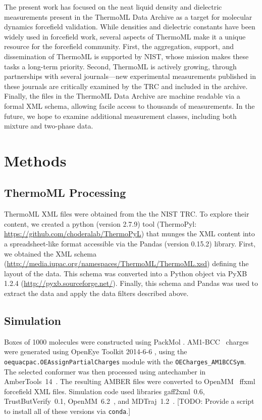 \documentclass[aps,pre,twocolumn,nofootinbib,superscriptaddress,linenumbers]{revtex4-1}
\begin{document}
The present work has focused on the neat liquid density and dielectric measurements present in the ThermoML Data Archive \cite{frenkel2006xml, frenkel2003thermoml, chirico2003thermoml} as a target for molecular dynamics forcefield validation.  
While densities and dielectric constants have been widely used in forcefield work, several aspects of ThermoML make it a unique resource for the forcefield community.  
First, the aggregation, support, and dissemination of ThermoML is supported by NIST, whose mission makes these tasks a long-term priority.  
Second, ThermoML is actively growing, through partnerships with several journals---new experimental measurements published in these journals are critically examined by the TRC and included in the archive.  
Finally, the files in the ThermoML Data Archive are machine readable via a formal XML schema, allowing facile access to thousands of measurements.  
In the future, we hope to examine additional measurement classes, including both mixture and two-phase data.




\section{Methods}

\subsection{ThermoML Processing}

ThermoML XML files were obtained from the the NIST TRC.  To explore their content, we created a python (version 2.7.9) tool (ThermoPyl: \url{https://github.com/choderalab/ThermoPyL}) that munges the XML content into a spreadsheet-like format accessible via the  Pandas (version 0.15.2) library.  
First, we obtained the XML schema (\url{http://media.iupac.org/namespaces/ThermoML/ThermoML.xsd}) defining the layout of the data.  
This schema was converted into a Python object via PyXB 1.2.4 (\url{http://pyxb.sourceforge.net/}).  
Finally, this schema and Pandas was used to extract the data and apply the data filters described above.  

\subsection{Simulation}
Boxes of 1000 molecules were constructed using PackMol \cite{martinez2009packmol}. 
AM1-BCC~\cite{am1bcc1,am1bcc2} charges were generated using OpenEye Toolkit 2014-6-6 \cite{openeye}, using the {\tt oequacpac.OEAssignPartialCharges} module with the {\tt OECharges\_AM1BCCSym}.  
The selected conformer was then processed using antechamber in AmberTools~14~\cite{amber14}.  
The resulting AMBER files were converted to OpenMM~\cite{eastman2012openmm} ffxml forcefield XML files.  
Simulation code used libraries gaff2xml~0.6, TrustButVerify~0.1, OpenMM~6.2~\cite{eastman2012openmm}, and MDTraj~1.2~\cite{mcgibbon2014mdtraj}.  
{\color{red}[TODO: Provide a script to install all of these versions via {\tt conda}.]}
\end{document}
